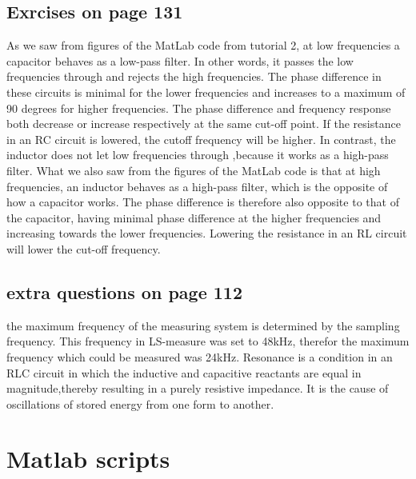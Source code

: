 \documentclass{article}
\begin{document}
\subsection{Exrcises on page 131}
As we saw from figures of the MatLab code from tutorial 2, at low frequencies
a capacitor behaves as a low-pass filter. In other words, it passes the low frequencies through and rejects the high frequencies. The phase difference in these circuits is minimal for the lower frequencies and increases to a maximum of 90 degrees for higher frequencies. The phase difference and frequency response both decrease or increase respectively at the same cut-off point.
\newline
If the resistance in an RC circuit is lowered, the cutoff frequency will be higher.
\newline
In contrast, the inductor does not let low frequencies through ,because it works as a high-pass filter.
\newline
What we also saw from the figures of the MatLab code is that at high frequencies, 
an inductor behaves as a high-pass filter, which is the opposite of how a capacitor works. The phase difference is therefore also opposite to that of the capacitor, having minimal phase difference at the higher frequencies and increasing towards the lower frequencies.
\newline
Lowering the resistance in an RL circuit will lower the cut-off frequency.
\newline
\subsection{extra questions on page 112} 
the maximum frequency of the measuring system is determined by the sampling frequency. This frequency in LS-measure was set to 48kHz, therefor the maximum frequency which could be measured was 24kHz.
\newline
Resonance is a condition in an RLC circuit in which the inductive and capacitive reactants are equal in magnitude,thereby resulting in a purely resistive impedance. It is the cause of oscillations of stored energy from one form to another. 

\newpage\section{Matlab scripts}
\end{document}
